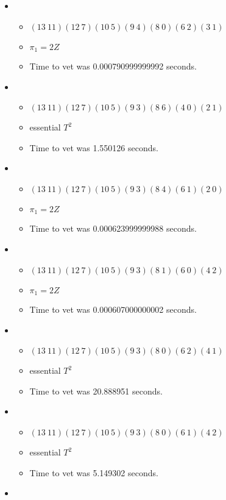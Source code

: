 \documentclass{article}
\begin{document}
\begin{itemize}
\begin{itemize}
\end{itemize}
\item \begin{itemize}
      \item $(13\ 11)(12\ 7)(10\ 5)(9\ 4)(8\ 0)(6\ 2)(3\ 1)$
      \item $\pi_1 =2 Z$
      \item Time to vet was 0.000790999999992 seconds.
\end{itemize}
\item \begin{itemize}
      \item $(13\ 11)(12\ 7)(10\ 5)(9\ 3)(8\ 6)(4\ 0)(2\ 1)$
      \item essential $T^2$
      \item Time to vet was 1.550126 seconds.
\end{itemize}
\item \begin{itemize}
      \item $(13\ 11)(12\ 7)(10\ 5)(9\ 3)(8\ 4)(6\ 1)(2\ 0)$
      \item $\pi_1 =2 Z$
      \item Time to vet was 0.000623999999988 seconds.
\end{itemize}
\item \begin{itemize}
      \item $(13\ 11)(12\ 7)(10\ 5)(9\ 3)(8\ 1)(6\ 0)(4\ 2)$
      \item $\pi_1 =2 Z$
      \item Time to vet was 0.000607000000002 seconds.
\end{itemize}
\item \begin{itemize}
      \item $(13\ 11)(12\ 7)(10\ 5)(9\ 3)(8\ 0)(6\ 2)(4\ 1)$
      \item essential $T^2$
      \item Time to vet was 20.888951 seconds.
\end{itemize}
\item \begin{itemize}
      \item $(13\ 11)(12\ 7)(10\ 5)(9\ 3)(8\ 0)(6\ 1)(4\ 2)$
      \item essential $T^2$
      \item Time to vet was 5.149302 seconds.
\end{itemize}
\item \begin{itemize}

\end{itemize}
\end{itemize}
\end{document}
